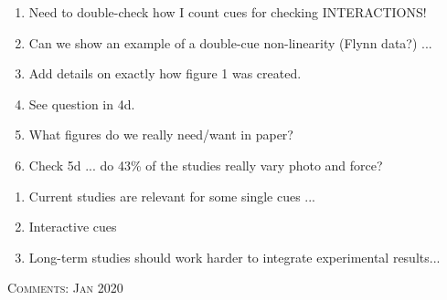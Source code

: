 \documentclass[11pt,letterpaper]{article}
\renewcommand{\section}[1]{%
\bigskip
\begin{center}
\begin{Large}
\normalfont\scshape #1
\medskip
\end{Large}
\end{center}}
\begin{document}
\newpage
{}
\begin{enumerate}
\item Need to double-check how I count cues for checking INTERACTIONS!
\item Can we show an example of a double-cue non-linearity (Flynn data?) ... 
\item Add details on exactly how figure 1 was created.
\item See question in 4d.
\item What figures do we really need/want in paper?
\item Check 5d ... do 43\% of the studies really vary photo and force?
\end{enumerate}


\begin{enumerate}
\item Current studies are relevant for some single cues ...
\item Interactive cues
\item Long-term studies should work harder to integrate experimental results... 
\end{enumerate}

\section{Comments: Jan 2020}
\end{document}
